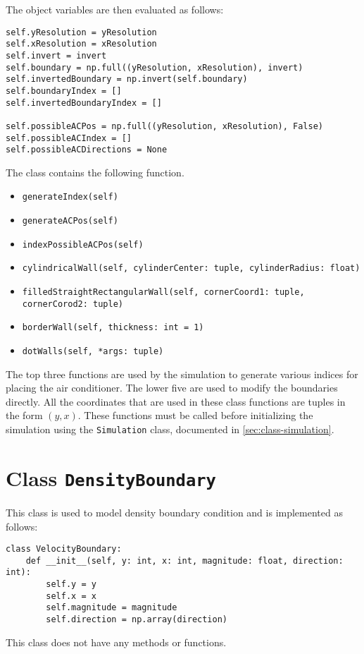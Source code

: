 The object variables are then evaluated as follows:
\begin{verbatim}
self.yResolution = yResolution
self.xResolution = xResolution
self.invert = invert
self.boundary = np.full((yResolution, xResolution), invert)
self.invertedBoundary = np.invert(self.boundary)
self.boundaryIndex = []
self.invertedBoundaryIndex = []

self.possibleACPos = np.full((yResolution, xResolution), False)
self.possibleACIndex = []
self.possibleACDirections = None
\end{verbatim}
The class contains the following function.
\begin{itemize}[noitemsep]
	\item \texttt{generateIndex(self)}
	\item \texttt{generateACPos(self)}
	\item \texttt{indexPossibleACPos(self)}
	\item \texttt{cylindricalWall(self, cylinderCenter: tuple, cylinderRadius: float)}
	\item \texttt{filledStraightRectangularWall(self, cornerCoord1: tuple, cornerCorod2: tuple)}
	\item \texttt{borderWall(self, thickness: int = 1)}
	\item \texttt{dotWalls(self, *args: tuple)}
\end{itemize}
The top three functions are used by the simulation to generate various indices for placing the air conditioner. The lower five are used to modify the boundaries directly. All the coordinates that are used in these class functions are tuples in the form $(y, x)$. These functions must be called before initializing the simulation using the \texttt{Simulation} class, documented in \cref{sec:class-simulation}.

\section[Class: density boundary condition]{Class \texttt{DensityBoundary}}

This class is used to model density boundary condition and is implemented as follows:
\begin{verbatim}
class VelocityBoundary:
    def __init__(self, y: int, x: int, magnitude: float, direction: int):
        self.y = y
        self.x = x
        self.magnitude = magnitude
        self.direction = np.array(direction)
\end{verbatim}
This class does not have any methods or functions.

